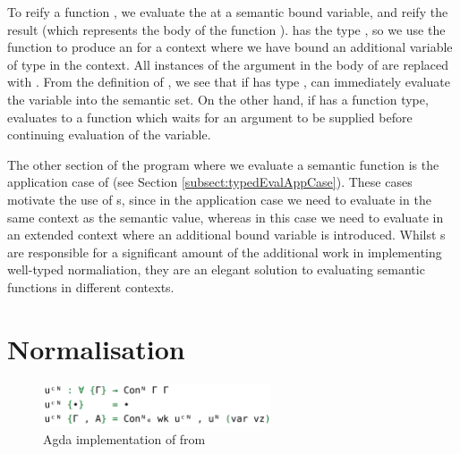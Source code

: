 To reify a function , we evaluate the  at a semantic bound variable, and reify the result (which represents the body of the function ).  has the type , so we use the  function to produce an  for a context where we have bound an additional variable of type  in the context. All instances of the argument in the body of  are replaced with . From the definition of , we see that if  has type ,  can immediately evaluate the variable into the semantic set. On the other hand, if  has a function type,  evaluates to a function which waits for an argument to be supplied before continuing evaluation of the variable.

The other section of the program where we evaluate a semantic function  is the application case of  (see Section \ref{subsect:typedEvalAppCase}). These cases motivate the use of s, since in the application case we need to evaluate  in the same context as the semantic value, whereas in this case we need to evaluate  in an extended context where an additional bound variable is introduced. Whilst s are responsible for a significant amount of the additional work in implementing well-typed normaliation, they are an elegant solution to evaluating semantic functions in different contexts.



\section{Normalisation}
\label{sect:typedNormalisation}

\begin{figure}[h]
    \centering
    \includegraphics[width=0.6\textwidth]{./images/agda_initial_env.png}
    \caption{Agda implementation of  from \cite{AgdaNbe}}
    \label{fig:agdaInitialEnv}
\end{figure}


